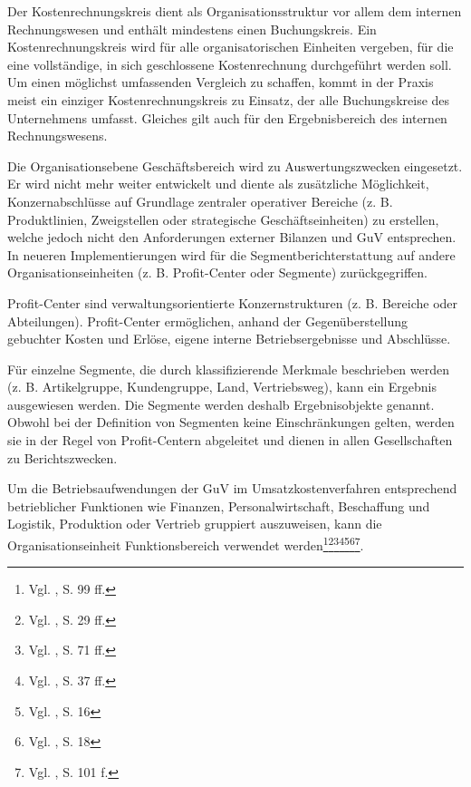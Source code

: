 Der Kostenrechnungskreis dient als Organisationsstruktur vor allem dem internen Rechnungswesen und enthält mindestens einen Buchungskreis. Ein Kostenrechnungskreis wird für alle organisatorischen Einheiten vergeben, für die eine vollständige, in sich geschlossene Kostenrechnung durchgeführt werden soll. Um einen möglichst umfassenden Vergleich zu schaffen, kommt in der Praxis meist ein einziger Kostenrechnungskreis zu Einsatz, der alle Buchungskreise des Unternehmens umfasst. Gleiches gilt auch für den Ergebnisbereich des internen Rechnungswesens.

Die Organisationsebene Geschäftsbereich wird zu Auswertungszwecken eingesetzt. Er wird nicht mehr weiter entwickelt und diente als zusätzliche Möglichkeit, Konzernabschlüsse auf Grundlage zentraler operativer Bereiche (z. B. Produktlinien, Zweigstellen oder strategische Geschäftseinheiten) zu erstellen, welche jedoch nicht den Anforderungen externer Bilanzen und GuV entsprechen. In neueren Implementierungen wird für die Segmentberichterstattung auf andere Organisationseinheiten (z. B. Profit-Center oder Segmente) zurückgegriffen.

Profit-Center sind verwaltungsorientierte Konzernstrukturen (z. B. Bereiche oder Abteilungen). Profit-Center ermöglichen, anhand der Gegenüberstellung gebuchter Kosten und Erlöse, eigene interne Betriebsergebnisse und Abschlüsse.

Für einzelne Segmente, die durch klassifizierende Merkmale beschrieben werden (z. B. Artikelgruppe, Kundengruppe, Land, Vertriebsweg), kann ein Ergebnis ausgewiesen werden. Die Segmente werden deshalb Ergebnisobjekte genannt. Obwohl bei der Definition von Segmenten keine Einschränkungen gelten, werden sie in der Regel von Profit-Centern abgeleitet und dienen in allen Gesellschaften zu Berichtszwecken. 

Um die Betriebsaufwendungen der GuV im Umsatzkostenverfahren entsprechend betrieblicher Funktionen wie Finanzen, Personalwirtschaft, Beschaffung und Logistik, Produktion oder Vertrieb gruppiert auszuweisen, kann die Organisationseinheit Funktionsbereich verwendet werden\footnote{Vgl. \cite{Hefner2001}, S. 99 ff.}\footnote{Vgl. \cite{Friedl2008}, S. 29 ff.}\footnote{Vgl. \cite{Maassen2006}, S. 71 ff.}\footnote{Vgl. \cite{Patel2009}, S. 37 ff.}\footnote{Vgl. \cite{Padhi2011}, S. 16}\footnote{Vgl. \cite{SAPFI2001}, S. 18}\footnote{Vgl. \cite{Jandt2008}, S. 101 f.}.

